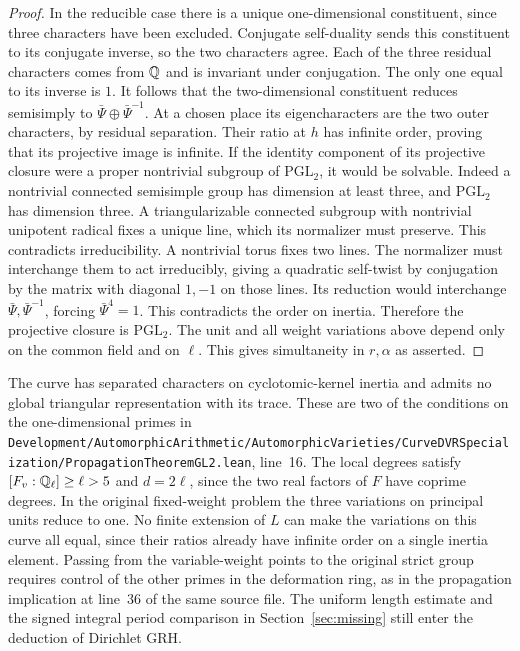 \documentclass[a4paper,11pt]{article}
\theoremstyle{definition}
\theoremstyle{remark}
\newcommand{\srcloc}[2]{{\small\nolinkurl{#1.lean}}, line~#2}
\numberwithin{equation}{section}
\begin{document}
\begin{proof}
In the reducible case there is a unique one-dimensional
constituent, since three characters have been excluded.
Conjugate self-duality sends this constituent to its conjugate
inverse, so the two characters agree. Each of the three
residual characters comes from \(\mathbb Q\) and is invariant under
conjugation. The only one equal to its inverse is \(1\).
It follows that the two-dimensional constituent reduces
semisimply to \(\bar\Psi\oplus\bar\Psi^{-1}\).
At a chosen place its eigencharacters are the two outer
characters, by residual separation. Their ratio at \(h\)
has infinite order, proving that its projective image is
infinite. If the identity component of its projective
closure were a proper nontrivial subgroup of
\(\mathrm{PGL}_2\), it would be solvable. Indeed a nontrivial
connected semisimple group has dimension at least three,
and \(\mathrm{PGL}_2\) has dimension three. A triangularizable
connected subgroup with nontrivial unipotent radical fixes
a unique line, which its normalizer must preserve. This
contradicts irreducibility. A nontrivial torus fixes two
lines. The normalizer must interchange them to act irreducibly,
giving a quadratic self-twist by conjugation by the matrix
with diagonal \(1,-1\) on those lines. Its reduction would
interchange \(\bar\Psi,\bar\Psi^{-1}\), forcing
\(\bar\Psi^4=1\). This contradicts the order on inertia.
Therefore the projective closure is \(\mathrm{PGL}_2\).
The unit and all weight variations above depend only on
the common field and on \(\ell\). This gives simultaneity
in \(r,\alpha\) as asserted.
\end{proof}

The curve has separated characters on cyclotomic-kernel inertia and admits no
global triangular representation with its trace. These are
two of the conditions on the one-dimensional primes in
\srcloc{Development/AutomorphicArithmetic/AutomorphicVarieties/CurveDVRSpecialization/PropagationTheoremGL2}{16}.
The local degrees satisfy \([F_v:\mathbb Q_\ell]\ge\ell>5\)
and \(d=2\ell\), since the two real factors of \(F\) have
coprime degrees. In the original fixed-weight problem the three variations on
principal units reduce to one. No finite extension of \(L\)
can make the variations on this curve all equal, since their ratios
already have infinite order on a single inertia element.
Passing from the variable-weight points to the original
strict group requires control of the other primes in the
deformation ring, as in the propagation implication at
line~36 of the same source file. The uniform length estimate
and the signed integral period comparison in
Section~\ref{sec:missing} still enter the deduction of
Dirichlet GRH.
\end{document}
